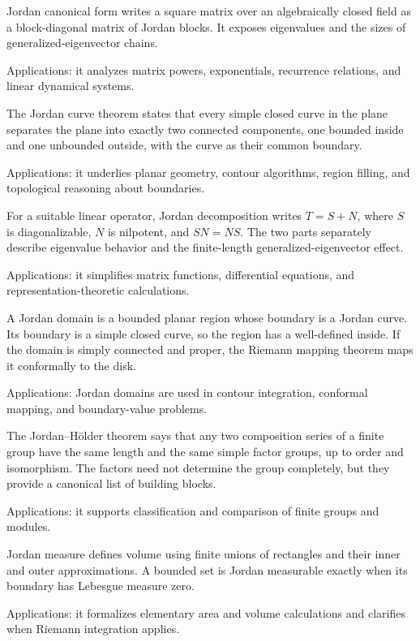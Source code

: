 Jordan canonical form writes a square matrix over an algebraically closed field as a block-diagonal matrix of Jordan blocks. It exposes eigenvalues and the sizes of generalized-eigenvector chains. \par\noindent Applications: it analyzes matrix powers, exponentials, recurrence relations, and linear dynamical systems.

The Jordan curve theorem states that every simple closed curve in the plane separates the plane into exactly two connected components, one bounded inside and one unbounded outside, with the curve as their common boundary. \par\noindent Applications: it underlies planar geometry, contour algorithms, region filling, and topological reasoning about boundaries.

For a suitable linear operator, Jordan decomposition writes $T=S+N$, where $S$ is diagonalizable, $N$ is nilpotent, and $SN=NS$. The two parts separately describe eigenvalue behavior and the finite-length generalized-eigenvector effect. \par\noindent Applications: it simplifies matrix functions, differential equations, and representation-theoretic calculations.

A Jordan domain is a bounded planar region whose boundary is a Jordan curve. Its boundary is a simple closed curve, so the region has a well-defined inside. If the domain is simply connected and proper, the Riemann mapping theorem maps it conformally to the disk. \par\noindent Applications: Jordan domains are used in contour integration, conformal mapping, and boundary-value problems.

The Jordan--Hölder theorem says that any two composition series of a finite group have the same length and the same simple factor groups, up to order and isomorphism. The factors need not determine the group completely, but they provide a canonical list of building blocks. \par\noindent Applications: it supports classification and comparison of finite groups and modules.

Jordan measure defines volume using finite unions of rectangles and their inner and outer approximations. A bounded set is Jordan measurable exactly when its boundary has Lebesgue measure zero. \par\noindent Applications: it formalizes elementary area and volume calculations and clarifies when Riemann integration applies.

